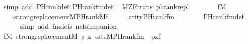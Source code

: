 \begin{isabellebody}
\ {\isacharparenleft}{\kern0pt}simp\ add{\isacharcolon}{\kern0pt}\ PHrank{\isacharunderscore}{\kern0pt}def\ PHrank{\isacharunderscore}{\kern0pt}fm{\isacharunderscore}{\kern0pt}def{\isacharparenright}{\kern0pt}%
\endisatagproof
{\isafoldproof}%
%
\isadelimproof
\isanewline
%
\endisadelimproof
\isanewline
\isanewline
{}\isamarkupfalse%
\ {\isacharparenleft}{\kern0pt}\ M{\isacharunderscore}{\kern0pt}ZF{\isacharunderscore}{\kern0pt}trans{\isacharparenright}{\kern0pt}\ phrank{\isacharunderscore}{\kern0pt}repl\ {\isacharcolon}{\kern0pt}\isanewline
\ \ \isanewline
\ \ \ \ {\isachardoublequoteopen}f{\isasymin}M{\isachardoublequoteclose}\isanewline
\ \ \isanewline
\ \ \ \ {\isachardoublequoteopen}strong{\isacharunderscore}{\kern0pt}replacement{\isacharparenleft}{\kern0pt}{\isacharhash}{\kern0pt}{\isacharhash}{\kern0pt}M{\isacharcomma}{\kern0pt}PHrank{\isacharparenleft}{\kern0pt}{\isacharhash}{\kern0pt}{\isacharhash}{\kern0pt}M{\isacharcomma}{\kern0pt}f{\isacharparenright}{\kern0pt}{\isacharparenright}{\kern0pt}{\isachardoublequoteclose}\isanewline
%
\isadelimproof
%
\endisadelimproof
%
\isatagproof
{}\isamarkupfalse%
\ {\isacharminus}{\kern0pt}\isanewline
\ \ \isamarkupfalse%
\ {\isachardoublequoteopen}arity{\isacharparenleft}{\kern0pt}PHrank{\isacharunderscore}{\kern0pt}fm{\isacharparenleft}{\kern0pt}{}{\isacharcomma}{\kern0pt}{}{\isacharcomma}{\kern0pt}{}{\isacharparenright}{\kern0pt}{\isacharparenright}{\kern0pt}\ {\isacharequal}{\kern0pt}\ {}{\isachardoublequoteclose}\isanewline
\ \ \ \ \isamarkupfalse%
\ PHrank{\isacharunderscore}{\kern0pt}fm{\isacharunderscore}{\kern0pt}def\isanewline
\ \ \ \ \isamarkupfalse%
\ {\isacharparenleft}{\kern0pt}simp\ add{\isacharcolon}{\kern0pt}\ fm{\isacharunderscore}{\kern0pt}defs\ nat{\isacharunderscore}{\kern0pt}simp{\isacharunderscore}{\kern0pt}union{\isacharparenright}{\kern0pt}\isanewline
\ \ \isamarkupfalse%
\isanewline
\ \ \isamarkupfalse%
\ {\isachardoublequoteopen}{\isasymforall}f{}{\isasymin}M{\isachardot}{\kern0pt}\ strong{\isacharunderscore}{\kern0pt}replacement{\isacharparenleft}{\kern0pt}{\isacharhash}{\kern0pt}{\isacharhash}{\kern0pt}M{\isacharcomma}{\kern0pt}\ {\isasymlambda}p\ z{\isachardot}{\kern0pt}\ sats{\isacharparenleft}{\kern0pt}M{\isacharcomma}{\kern0pt}PHrank{\isacharunderscore}{\kern0pt}fm{\isacharparenleft}{\kern0pt}{}{\isacharcomma}{\kern0pt}{}{\isacharcomma}{\kern0pt}{}{\isacharparenright}{\kern0pt}\ {\isacharcomma}{\kern0pt}\ {\isacharbrackleft}{\kern0pt}p{\isacharcomma}{\kern0pt}z{\isacharcomma}{\kern0pt}f{}{\isacharbrackright}{\kern0pt}{\isacharparenright}{\kern0pt}{\isacharparenright}{\kern0pt}{\isachardoublequoteclose}\isanewline

\end{isabellebody}
